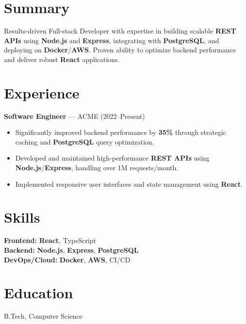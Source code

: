\documentclass{article}
\begin{document}
\section*{Summary}
Results-driven Full-stack Developer with expertise in building scalable \textbf{REST APIs} using \textbf{Node.js} and \textbf{Express}, integrating with \textbf{PostgreSQL}, and deploying on \textbf{Docker}/\textbf{AWS}. Proven ability to optimize backend performance and deliver robust \textbf{React} applications.

\section*{Experience}
\textbf{Software Engineer} — ACME (2022--Present)\\
\begin{itemize}
\item Significantly improved backend performance by \textbf{35\%} through strategic caching and \textbf{PostgreSQL} query optimization.
\item Developed and maintained high-performance \textbf{REST APIs} using \textbf{Node.js}/\textbf{Express}, handling over 1M requests/month.
\item Implemented responsive user interfaces and state management using \textbf{React}.
\end{itemize}

\section*{Skills}
\textbf{Frontend:} \textbf{React}, TypeScript \\
\textbf{Backend:} \textbf{Node.js}, \textbf{Express}, \textbf{PostgreSQL} \\
\textbf{DevOps/Cloud:} \textbf{Docker}, \textbf{AWS}, CI/CD

\section*{Education}
B.Tech, Computer Science
\end{document}
